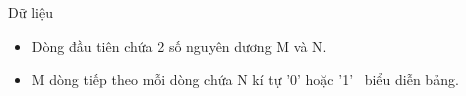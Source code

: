Dữ liệu
\begin{itemize}
	\item     Dòng đầu tiên chứa 2 số nguyên dương M và N.   
	\item     M dòng tiếp theo mỗi dòng chứa N kí tự '0' hoặc '1'  biểu diễn bảng.   
\end{itemize}